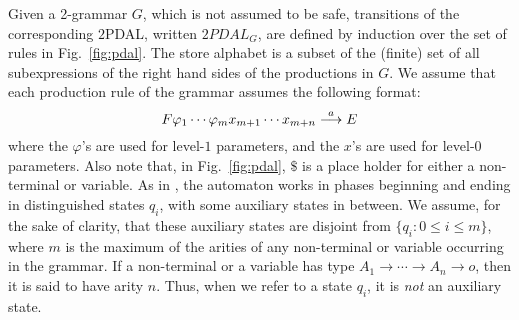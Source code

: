 Given a 2-grammar $G$, which is not assumed to be safe,
transitions of the corresponding $2$PDAL, written $2PDAL_G$, are
defined by induction over the set of rules in Fig.~\ref{fig:pdal}.
The store alphabet is a subset of the (finite) set of all
subexpressions of the right hand sides of the productions in $G$.
We assume that each production rule of the grammar assumes the
following format:
\begin{equation}
\label{convention} F \varphi_1 \cdots \varphi_m x_{m+1} \cdots x_{m+n} \stackrel{{a}}{\longrightarrow} E
\end{equation}
where the $\varphi$'s are used for level-$1$ parameters, and the
$x$'s are used for level-$0$ parameters.  Also note that, in
Fig.~\ref{fig:pdal}, $\$$ is a place holder for either a
non-terminal or variable. As in \cite{KNU02}, the automaton works
in phases beginning and ending in distinguished states $q_i$, with
some auxiliary states in between. We assume, for the sake of
clarity, that these auxiliary states are disjoint from $\{q_i : 0
\leq i \leq m\}$, where $m$ is the maximum of the arities of any
non-terminal or variable occurring in the grammar. If a
non-terminal or a variable has type $A_1 \rightarrow \cdots \rightarrow A_n
\rightarrow o$, then it is said to have arity $n$. Thus, when we
refer to a state $q_i$, it is \emph{not} an auxiliary state.

\begin{figure*}[t]
\begin{center}
\end{center}
\caption{Transition rules of the $2$PDAL, $2PDAL_G$.
\label{fig:pdal}}
\end{figure*}


